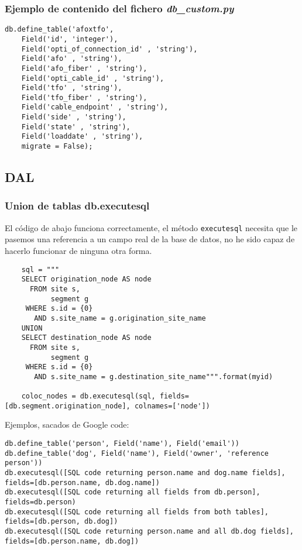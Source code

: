 \documentclass[12pt,spanish,]{article}
\begin{document}
\hypertarget{ejemplo-de-contenido-del-fichero-db_custom.py}{%
\subsubsection{\texorpdfstring{Ejemplo de contenido del fichero
\emph{db\_custom.py}}{Ejemplo de contenido del fichero db\_custom.py}}\label{ejemplo-de-contenido-del-fichero-db_custom.py}}

\begin{verbatim}
db.define_table('afoxtfo',
    Field('id', 'integer'),
    Field('opti_of_connection_id' , 'string'),
    Field('afo' , 'string'),
    Field('afo_fiber' , 'string'),
    Field('opti_cable_id' , 'string'),
    Field('tfo' , 'string'),
    Field('tfo_fiber' , 'string'),
    Field('cable_endpoint' , 'string'),
    Field('side' , 'string'),
    Field('state' , 'string'),
    Field('loaddate' , 'string'),
    migrate = False);
\end{verbatim}

\hypertarget{dal}{%
\subsection{DAL}\label{dal}}

\hypertarget{union-de-tablas-db.executesql}{%
\subsubsection{Union de tablas
db.executesql}\label{union-de-tablas-db.executesql}}

El código de abajo funciona correctamente, el método \texttt{executesql}
necesita que le pasemos una referencia a un campo real de la base de
datos, no he sido capaz de hacerlo funcionar de ninguna otra forma.

\begin{verbatim}
    sql = """
    SELECT origination_node AS node
      FROM site s,
           segment g
     WHERE s.id = {0}
       AND s.site_name = g.origination_site_name
    UNION
    SELECT destination_node AS node
      FROM site s,
           segment g
     WHERE s.id = {0}
       AND s.site_name = g.destination_site_name""".format(myid)

    coloc_nodes = db.executesql(sql, fields=[db.segment.origination_node], colnames=['node'])
\end{verbatim}

Ejemplos, sacados de Google code:

\begin{verbatim}
db.define_table('person', Field('name'), Field('email'))
db.define_table('dog', Field('name'), Field('owner', 'reference person'))
db.executesql([SQL code returning person.name and dog.name fields], fields=[db.person.name, db.dog.name])
db.executesql([SQL code returning all fields from db.person], fields=db.person)
db.executesql([SQL code returning all fields from both tables], fields=[db.person, db.dog])
db.executesql([SQL code returning person.name and all db.dog fields], fields=[db.person.name, db.dog])
\end{verbatim}
\end{document}
